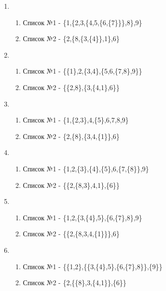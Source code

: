 \documentclass[a4paper,12pt]{article}
\begin{document}
\begin{enumerate}
	\item \begin{enumerate}
		\item Список №1 - \{1,\{2,3,\{4,5,\{6,\{7\}\}\},8\},9\}
		\item Список №2 - \{2,\{8,\{3,\{4\}\},1\},6\}
	\end{enumerate}

	\item \begin{enumerate}
		\item Список №1 - \{\{1\},2,\{3,4\},\{5,6,\{7,8\},9\}\}
		\item Список №2 - \{\{2,8\},\{3,\{4,1\},6\}\}
	\end{enumerate}

	\item \begin{enumerate}
		\item Список №1 - \{1,\{2,3\},4,\{5\},6,7,8,9\}
		\item Список №2 - \{2,\{8\},\{3,4,\{1\}\},6\}
	\end{enumerate}

	\item \begin{enumerate}
		\item Список №1 - \{1,2,\{3\},\{4\},\{5\},6,\{7,\{8\}\},9\}
		\item Список №2 - \{\{2,\{8,3\},4,1\},\{6\}\}
	\end{enumerate}

	\item \begin{enumerate}
		\item Список №1 - \{1,2,\{3,\{4\},5\},\{6,\{7\},8\},9\}
		\item Список №2 - \{\{2,\{8,3,4,\{1\}\}\},6\}
	\end{enumerate}

	\item \begin{enumerate}
		\item Список №1 - \{\{1,2\},\{\{3,\{4\},5\},\{6,\{7\},8\}\},\{9\}\}
		\item Список №2 - \{2,\{\{8\},3,\{4,1\}\},\{6\}\}
	\end{enumerate}

\end{enumerate}
\end{document}
